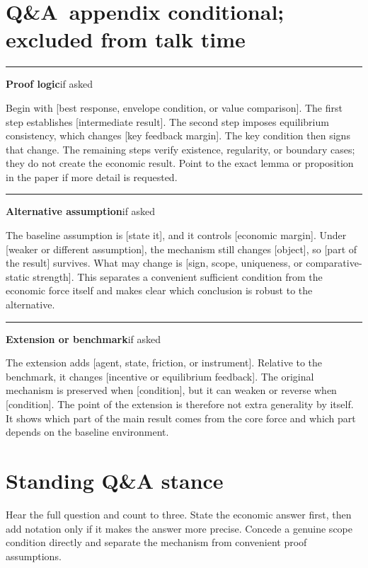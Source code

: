 \documentclass[11pt]{article}
\newcommand{\scriptframe}[3]{%
  \Needspace{9\baselineskip}%
  \par\medskip\noindent\textcolor{ScriptBlue}{\rule{\linewidth}{0.55pt}}%
  \par\smallskip\noindent
  \textbf{#1}\hfill\textcolor{ScriptGray}{\small #2}\par\smallskip
  #3\par}
\newcommand{\ScriptAppendix}{%
  \clearpage
  \section*{\mbox{Q\&A appendix} \hfill
    \normalfont\small\textcolor{ScriptGray}{conditional; excluded from talk time}}}
\begin{document}
\ScriptAppendix

\scriptframe{Proof logic}{if asked}{%
  Begin with [best response, envelope condition, or value comparison]. The
  first step establishes [intermediate result]. The second step imposes
  equilibrium consistency, which changes [key feedback margin]. The
  key condition then signs that change. The remaining steps verify
  existence, regularity, or boundary cases; they do not create the economic
  result. Point to the exact lemma or proposition in the paper if more detail
  is requested.
}

\scriptframe{Alternative assumption}{if asked}{%
  The baseline assumption is [state it], and it controls [economic margin].
  Under [weaker or different assumption], the mechanism still changes
  [object], so [part of the result] survives. What may change is [sign, scope,
  uniqueness, or comparative-static strength]. This separates a convenient
  sufficient condition from the economic force itself and makes clear which
  conclusion is robust to the alternative.
}

\scriptframe{Extension or benchmark}{if asked}{%
  The extension adds [agent, state, friction, or instrument]. Relative to the
  benchmark, it changes [incentive or equilibrium feedback]. The original
  mechanism is preserved when [condition], but it can weaken or reverse when
  [condition]. The point of the extension is therefore not extra generality
  by itself. It shows which part of the main result comes from the core force
  and which part depends on the baseline environment.
}

\section*{Standing Q\&A stance}
Hear the full question and count to three. State the economic answer first,
then add notation only if it makes the answer more precise. Concede a genuine
scope condition directly and separate the mechanism from convenient proof
assumptions.

\end{document}
